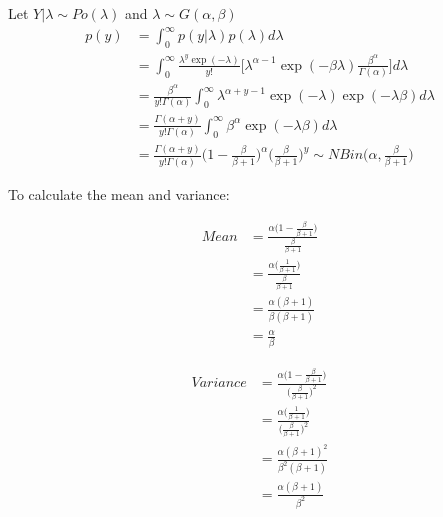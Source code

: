 Let $Y|\lambda \sim Po(\lambda)$ and $\lambda \sim G(\alpha,\beta)$
\begin{align*}
p(y)&=\int^\infty_0 p(y|\lambda) p(\lambda) d\lambda\\
&=\int^\infty_0 \frac{\lambda^y\exp(-\lambda)}{y!}\Bigg[\lambda^{\alpha-1}\exp(-\beta\lambda)\frac{\beta^\alpha}{\Gamma(\alpha)}\Bigg]d\lambda\\
&=\frac{\beta^\alpha}{y!\Gamma(\alpha)}\int^\infty_0 \lambda^{\alpha+y-1}\exp(-\lambda)\exp(-\lambda\beta)d\lambda\\
&=\frac{\Gamma(\alpha+y)}{y!\Gamma(\alpha)}\int^\infty_0 \beta^\alpha \exp(-\lambda\beta)d\lambda\\
&=\frac{\Gamma(\alpha+y)}{y!\Gamma(\alpha)}\Bigg(1-\frac{\beta}{\beta+1}\Bigg)^{\alpha}\Bigg(\frac{\beta}{\beta+1}\Bigg)^y \sim NBin \Bigg(\alpha, \frac{\beta}{\beta+1}\Bigg)
\end{align*}

To calculate the mean and variance:

\begin{align*}
Mean &= \frac{\alpha\bigg(1-\frac{\beta}{\beta+1}\bigg)}{\frac{\beta}{\beta+1}}\\
&= \frac{\alpha\bigg (\frac{1}{\beta+1}\bigg)}{\frac{\beta}{\beta+1}}\\
&= \frac{\alpha(\beta+1)}{\beta(\beta+1)}\\
&= \frac{\alpha}{\beta}
\end{align*}

\begin{align*}
Variance &= \frac{\alpha\bigg(1-\frac{\beta}{\beta+1}\bigg)}{\bigg(\frac{\beta}{\beta+1}\bigg)^2}\\
&= \frac{\alpha\bigg (\frac{1}{\beta+1}\bigg)}{\bigg(\frac{\beta}{\beta+1}\bigg)^2}\\
&= \frac{\alpha(\beta+1)^2}{\beta^2(\beta+1)}\\
&= \frac{\alpha(\beta+1)}{\beta^2}
\end{align*}








